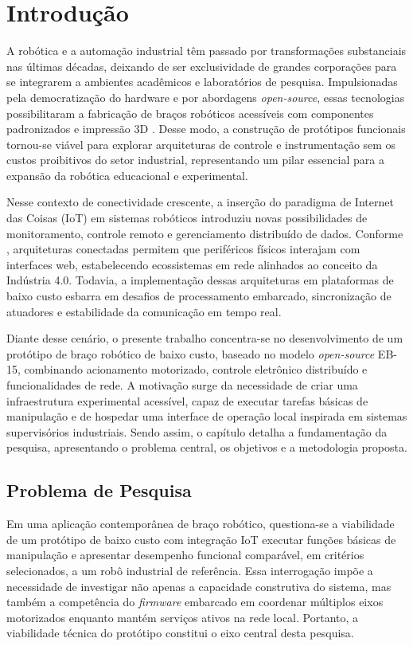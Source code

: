 \chapter{Introdução}

A robótica e a automação industrial têm passado por transformações substanciais nas últimas décadas, deixando de ser exclusividade de grandes corporações para se integrarem a ambientes acadêmicos e laboratórios de pesquisa. Impulsionadas pela democratização do hardware e por abordagens \textit{open-source}, essas tecnologias possibilitaram a fabricação de braços robóticos acessíveis com componentes padronizados e impressão 3D \cite{silva2020}. Desse modo, a construção de protótipos funcionais tornou-se viável para explorar arquiteturas de controle e instrumentação sem os custos proibitivos do setor industrial, representando um pilar essencial para a expansão da robótica educacional e experimental.

Nesse contexto de conectividade crescente, a inserção do paradigma de Internet das Coisas (IoT) em sistemas robóticos introduziu novas possibilidades de monitoramento, controle remoto e gerenciamento distribuído de dados. Conforme , arquiteturas conectadas permitem que periféricos físicos interajam com interfaces web, estabelecendo ecossistemas em rede alinhados ao conceito da Indústria 4.0. Todavia, a implementação dessas arquiteturas em plataformas de baixo custo esbarra em desafios de processamento embarcado, sincronização de atuadores e estabilidade da comunicação em tempo real.

Diante desse cenário, o presente trabalho concentra-se no desenvolvimento de um protótipo de braço robótico de baixo custo, baseado no modelo \textit{open-source} EB-15, combinando acionamento motorizado, controle eletrônico distribuído e funcionalidades de rede. A motivação surge da necessidade de criar uma infraestrutura experimental acessível, capaz de executar tarefas básicas de manipulação e de hospedar uma interface de operação local inspirada em sistemas supervisórios industriais. Sendo assim, o capítulo detalha a fundamentação da pesquisa, apresentando o problema central, os objetivos e a metodologia proposta.

\section{Problema de Pesquisa}

Em uma aplicação contemporânea de braço robótico, questiona-se a viabilidade de um protótipo de baixo custo com integração IoT executar funções básicas de manipulação e apresentar desempenho funcional comparável, em critérios selecionados, a um robô industrial de referência. Essa interrogação impõe a necessidade de investigar não apenas a capacidade construtiva do sistema, mas também a competência do \textit{firmware} embarcado em coordenar múltiplos eixos motorizados enquanto mantém serviços ativos na rede local. Portanto, a viabilidade técnica do protótipo constitui o eixo central desta pesquisa.

